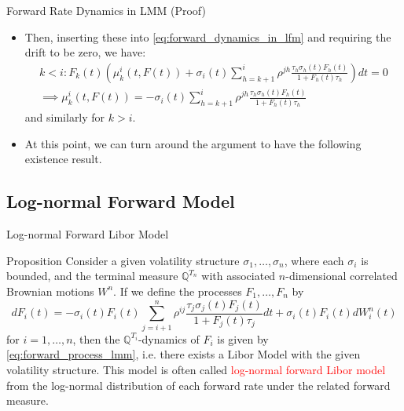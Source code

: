 \documentclass{beamer}
\begin{document}
\begin{frame}{Forward Rate Dynamics in LMM (Proof)}
	\begin{itemize}
	\item<1-> Then, inserting these into \cref{eq:forward_dynamics_in_lfm} and requiring the drift to be zero, we have:
		\begin{equation*}
			\begin{gathered}
				k < i : F_k(t)\left( \mu_k^i(t, F(t)) + \sigma_i(t)\sum_{h=k+1}^i \rho^{jh} \frac{\tau_h\sigma_h(t)F_h(t)}{1+F_h(t)\tau_h}\right) dt = 0 \\
				\implies \mu_k^i(t, F(t)) = - \sigma_i(t)\sum_{h=k+1}^i \rho^{jh} \frac{\tau_h\sigma_h(t)F_h(t)}{1+F_h(t)\tau_h}
			\end{gathered}
		\end{equation*}
		and similarly for $k > i$.
\myendproof
	\item<2-> At this point, we can turn around the argument to have the following existence result.
	\end{itemize}
\end{frame}

\subsection{Log-normal Forward Model}
\begin{frame}{Log-normal Forward Libor Model}
  \begin{block}{Proposition}
    Consider a given volatility structure $\sigma_1,\ldots, \sigma_n$, where each $\sigma_i$ is bounded, and the terminal measure $\mathbb{Q}^{T_n}$ with associated $n$-dimensional correlated Brownian motions $W^n$. If we define the processes $F_1,\ldots, F_n$ by
    \begin{equation}
      dF_i(t) = -\sigma_i(t)F_i(t)\sum_{j=i+1}^n \rho^{ij} \frac{\tau_j\sigma_j(t)F_j(t)}{1+F_j(t)\tau_j} dt + \sigma_i(t)F_i(t)dW^n_i(t)
    \end{equation}
    for $i = 1,\ldots, n$, then the $\mathbb{Q}^{T_i}$-dynamics of $F_i$ is given by \cref{eq:forward_process_lmm}, i.e. there exists a Libor Model with the given volatility structure.
  This model is often called \textcolor{red}{log-normal forward Libor model} from the log-normal distribution of each forward rate under the related forward measure.
  \end{block}
\end{frame}
\end{document}

